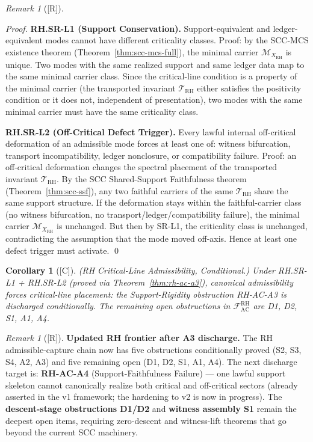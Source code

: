 \documentclass[12pt,oneside]{amsbook}
\theoremstyle{plain}
\newtheorem{corollary}[theorem]{Corollary}
\theoremstyle{definition}
\theoremstyle{remark}
\newtheorem{remark}[theorem]{Remark}
\newcommand{\status}[1]{\textup{[#1]}}
\begin{document}
\begin{remark}[\status{R}]
\begin{proof}
\textbf{RH.SR-L1 (Support Conservation).} Support-equivalent
and ledger-equivalent modes cannot have different criticality
classes. Proof: by the SCC-MCS existence theorem
(Theorem~\ref{thm:scc-mcs-full}), the minimal carrier
$\mathcal{M}_{X_{\mathrm{RH}}}$ is unique. Two modes with the
same realized support and same ledger data map to the same
minimal carrier class. Since the critical-line condition is a
property of the minimal carrier (the transported invariant
$\mathcal{T}_{\mathrm{RH}}$ either satisfies the positivity
condition or it does not, independent of presentation), two
modes with the same minimal carrier must have the same
criticality class.

\textbf{RH.SR-L2 (Off-Critical Defect Trigger).} Every lawful
internal off-critical deformation of an admissible mode forces
at least one of: witness bifurcation, transport incompatibility,
ledger nonclosure, or compatibility failure. Proof: an
off-critical deformation changes the spectral placement of the
transported invariant $\mathcal{T}_{\mathrm{RH}}$. By the
SCC Shared-Support Faithfulness theorem
(Theorem~\ref{thm:scc-ssf}), any two faithful carriers of the
same $\mathcal{T}_{\mathrm{RH}}$ share the same support structure.
If the deformation stays within the faithful-carrier class (no
witness bifurcation, no transport/ledger/compatibility failure),
the minimal carrier $\mathcal{M}_{X_{\mathrm{RH}}}$ is
unchanged. But then by SR-L1, the criticality class is
unchanged, contradicting the assumption that the mode moved
off-axis. Hence at least one defect trigger must activate. \qed
\end{proof}

\begin{corollary}[\status{C}]\label{cor:rh-cla}
\textup{(RH Critical-Line Admissibility, Conditional.)}
Under RH.SR-L1 + RH.SR-L2 (proved via
Theorem~\ref{thm:rh-ac-a3}), canonical admissibility forces
critical-line placement: the Support-Rigidity obstruction
RH-AC-A3 is discharged conditionally. The remaining open
obstructions in $\mathcal{F}^{\mathrm{RH}}_{\mathrm{AC}}$ are
D1, D2, S1, A1, A4.
\end{corollary}

\begin{remark}[\status{R}]\label{rem:rh-post-a3}
\textbf{Updated RH frontier after A3 discharge.}
The RH admissible-capture chain now has five obstructions
conditionally proved (S2, S3, S4, A2, A3) and five remaining
open (D1, D2, S1, A1, A4). The next discharge target is:
\textbf{RH-AC-A4} (Support-Faithfulness Failure) --- one
lawful support skeleton cannot canonically realize both
critical and off-critical sectors (already asserted in the v1
framework; the hardening to v2 is now in progress).
The \textbf{descent-stage obstructions D1/D2} and
\textbf{witness assembly S1} remain the deepest open items,
requiring zero-descent and witness-lift theorems that go beyond
the current SCC machinery.
\end{remark}




\end{remark}
\end{document}
